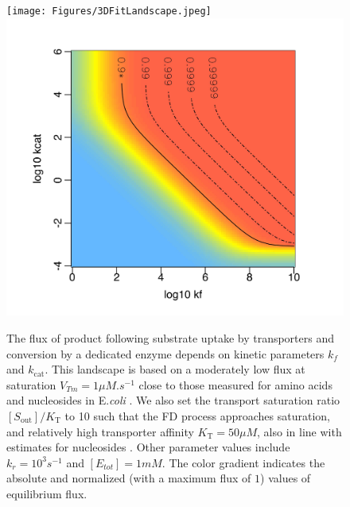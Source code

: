 \documentclass[nogrid,crop,final]{MBE2}%
\newcommand{\othercaption}[1]{\caption{\setlength{\baselineskip}{1.5\baselineskip}#1}}
\begin{document}
\begin{figure}[t!]
\centering
\texttt{[image: Figures/3DFitLandscape.jpeg]} 
\includegraphics[scale=0.6,trim=0 0cm 0cm 0.5cm,clip]{Figures/2DFitLandscape.jpeg}  
\othercaption{The flux of product following substrate uptake by transporters and conversion by a dedicated enzyme depends on kinetic parameters $k_f$ and $k_\text{cat}$. This landscape is based on a moderately low flux at saturation $V_{Tm}=1 \mu M.s^{-1}$ close to those measured for amino acids and nucleosides in E.\textit{coli} \citep{Zampieri2019}. We also set the transport saturation ratio $[S_\text{out}]/K_\text{T}$ to 10 such that the FD process approaches saturation, and relatively high transporter affinity $K_\text{T}=50\mu M$, also in line with estimates for nucleosides \citep{Griffith96,Xie04}. Other parameter values include $k_r=10^3s^{-1}$ and $[E_{tot}]=1mM$. The color gradient indicates the absolute and normalized (with a maximum flux of $1$) values of equilibrium flux.
}
\label{figure3D2DFit}
\end{figure}
\end{document}
